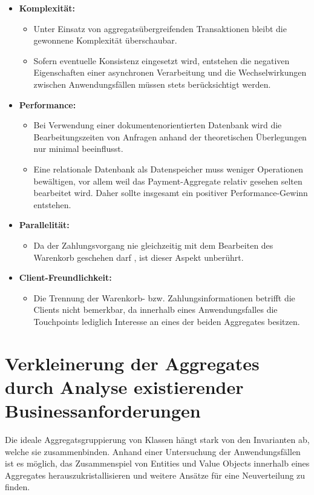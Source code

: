 \begin{itemize}[noitemsep,nolistsep,topsep=-2pt]
	\item \textbf{Komplexität: } {
		\begin{itemize}
			\item {Unter Einsatz von aggregatsübergreifenden Transaktionen bleibt die gewonnene Komplexität überschaubar.}
			\item {Sofern eventuelle Konsistenz eingesetzt wird, entstehen die negativen Eigenschaften einer asynchronen Verarbeitung und die Wechselwirkungen zwischen Anwendungsfällen müssen stets berücksichtigt werden.}
		\end{itemize}
	}
	\item \textbf{Performance: } {
		\begin{itemize}
			\item Bei Verwendung einer dokumentenorientierten Datenbank wird die Bearbeitungszeiten von Anfragen anhand der theoretischen Überlegungen nur minimal beeinflusst.
			\item Eine relationale Datenbank als Datenspeicher muss weniger Operationen bewältigen, vor allem weil das Payment-Aggregate relativ gesehen selten bearbeitet wird. Daher sollte insgesamt ein positiver Performance-Gewinn entstehen. 
		\end{itemize}
	}
	\item \textbf{Parallelität: } {
		\begin{itemize}
			\item Da der Zahlungsvorgang nie gleichzeitig mit dem Bearbeiten des Warenkorb geschehen darf , ist dieser Aspekt unberührt. 
		\end{itemize}	
	}
	\item \textbf{Client-Freundlichkeit: } {
		\begin{itemize}
			\item Die Trennung der Warenkorb- bzw. Zahlungsinformationen betrifft die Clients nicht bemerkbar, da innerhalb eines Anwendungsfalles die Touchpoints lediglich Interesse an eines der beiden Aggregates besitzen.
		\end{itemize}
	}
\end{itemize}


\section{Verkleinerung der Aggregates durch Analyse existierender Businessanforderungen}

Die ideale Aggregatsgruppierung von Klassen hängt stark von den Invarianten ab, welche sie zusammenbinden. Anhand einer Untersuchung der Anwendungsfällen ist es möglich, das Zusammenspiel von Entities und Value Objects innerhalb eines Aggregates herauszukristallisieren und weitere Ansätze für eine Neuverteilung zu finden.

